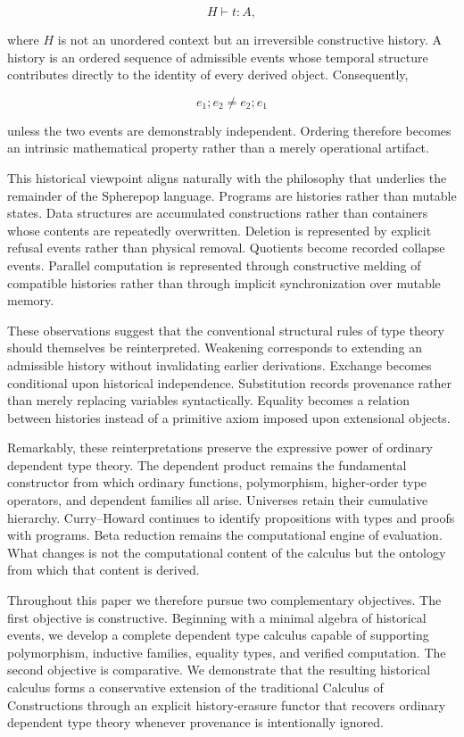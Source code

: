 \documentclass[12pt,oneside]{article}
\theoremstyle{definition}
\theoremstyle{remark}
\begin{document}
\[
H \vdash t : A,
\]

where $H$ is not an unordered context but an irreversible constructive history. A history is an ordered sequence of admissible events whose temporal structure contributes directly to the identity of every derived object. Consequently,

\[
e_1 ; e_2
\neq
e_2 ; e_1
\]

unless the two events are demonstrably independent. Ordering therefore becomes an intrinsic mathematical property rather than a merely operational artifact.

This historical viewpoint aligns naturally with the philosophy that underlies the remainder of the Spherepop language. Programs are histories rather than mutable states. Data structures are accumulated constructions rather than containers whose contents are repeatedly overwritten. Deletion is represented by explicit refusal events rather than physical removal. Quotients become recorded collapse events. Parallel computation is represented through constructive melding of compatible histories rather than through implicit synchronization over mutable memory.

These observations suggest that the conventional structural rules of type theory should themselves be reinterpreted. Weakening corresponds to extending an admissible history without invalidating earlier derivations. Exchange becomes conditional upon historical independence. Substitution records provenance rather than merely replacing variables syntactically. Equality becomes a relation between histories instead of a primitive axiom imposed upon extensional objects.

Remarkably, these reinterpretations preserve the expressive power of ordinary dependent type theory. The dependent product remains the fundamental constructor from which ordinary functions, polymorphism, higher-order type operators, and dependent families all arise. Universes retain their cumulative hierarchy. Curry--Howard continues to identify propositions with types and proofs with programs. Beta reduction remains the computational engine of evaluation. What changes is not the computational content of the calculus but the ontology from which that content is derived.

Throughout this paper we therefore pursue two complementary objectives. The first objective is constructive. Beginning with a minimal algebra of historical events, we develop a complete dependent type calculus capable of supporting polymorphism, inductive families, equality types, and verified computation. The second objective is comparative. We demonstrate that the resulting historical calculus forms a conservative extension of the traditional Calculus of Constructions through an explicit history-erasure functor that recovers ordinary dependent type theory whenever provenance is intentionally ignored.
\end{document}

